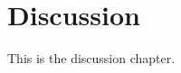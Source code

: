 \documentclass[../main.tex]{subfiles}
\begin{document}
\chapter{Discussion}

This is the discussion chapter.
\end{document}
